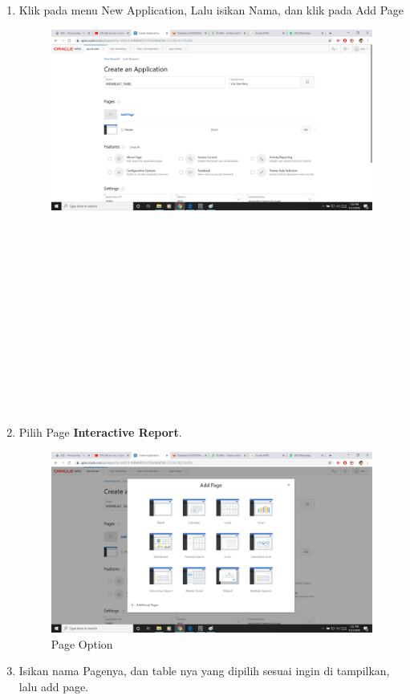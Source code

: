 \documentclass[12pt, times new roman]{article}
\begin{document}
\begin{enumerate}
\item Klik pada menu New Application, Lalu isikan Nama, dan klik pada Add Page
\begin{figure}[h]
	\centering
		\includegraphics[scale=0.2]{Gambar/Capture10}
\end{figure}
\\
\\
\\
\\
\\
\\
\\
\\
\\
\\
\\
\\
\item Pilih Page \textbf{Interactive Report}.
\begin{figure}[h]
	\centering
		\includegraphics[scale=0.2]{Gambar/Capture11}
	\caption{Page Option}
\end{figure}
\item Isikan nama Pagenya, dan table nya yang dipilih sesuai ingin di tampilkan, lalu add page.

\end{enumerate}
\end{document}
